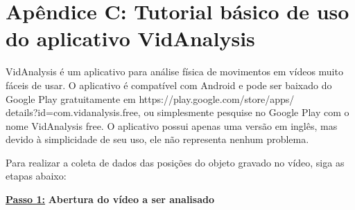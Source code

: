 \documentclass[12pt]{article}
\begin{document}
\clearpage

\section{Apêndice C: Tutorial básico de uso do aplicativo VidAnalysis}
\label{ApendiceC}
\indent
VidAnalysis é um aplicativo para análise física de movimentos em vídeos muito fáceis de usar.
O aplicativo é compatível com Android e pode ser baixado do Google Play gratuitamente em {\color{blue} https://play.google.com/store/apps/\\details?id=com.vidanalysis.free}, ou simplesmente pesquise no Google Play com o nome VidAnalysis free. O aplicativo possui apenas uma versão em inglês, mas devido à simplicidade de seu uso, ele não representa nenhum problema.

Para realizar a coleta de dados das posições do objeto gravado no vídeo, siga as etapas abaixo:

\underline{\bf Passo 1:} {\bf Abertura do vídeo a ser analisado}\\
\indent
\end{document}
